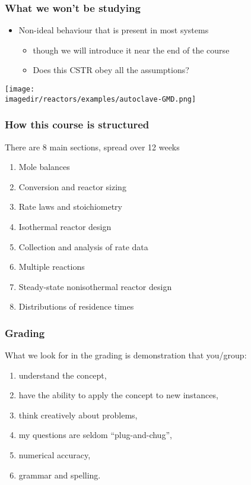 \begin{frame}\frametitle{What we won't be studying}
	\begin{itemize}
		\item	Non-ideal behaviour that is present in most systems 
		\begin{itemize}
			\item	though we will introduce it near the end of the course
			\item	Does this CSTR obey all the assumptions?
		\end{itemize}
	\end{itemize}
	\begin{center}
		\texttt{[image: \\imagedir/reactors/examples/autoclave-GMD.png]}
	\end{center}
\end{frame}

\begin{frame}\frametitle{How this course is structured}
	There are 8 main sections, spread over 12 weeks
	\begin{enumerate}
		\item	Mole balances 
		\item	Conversion and reactor sizing
		\item	Rate laws and stoichiometry
		\item	Isothermal reactor design
		\item	Collection and analysis of rate data
		\item	Multiple reactions
		\item	Steady-state nonisothermal reactor design 
		\item	Distributions of residence times 
	\end{enumerate}
\end{frame}

\begin{frame}\frametitle{Grading}
	What we look for in the grading is demonstration that you/group: 
	\begin{enumerate}
		\item	understand the concept, 
		\item	have the ability to apply the concept to new instances, 
		\item	think creatively about problems, 
		\item	my questions are seldom ``plug-and-chug'',
		\item	numerical accuracy, 
		\item	grammar and spelling.
	\end{enumerate}
\end{frame}

